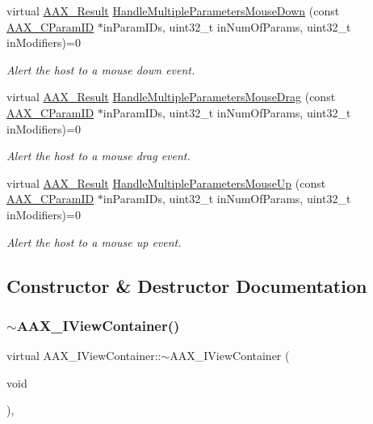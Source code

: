 \begin{Indent}
\begin{DoxyCompactItemize}
virtual \mbox{\hyperlink{a00392_a4d8f69a697df7f70c3a8e9b8ee130d2f}{A\+A\+X\+\_\+\+Result}} \mbox{\hyperlink{a01889_ae4eb23fadc9f9e437fbcf2a73741f635}{Handle\+Multiple\+Parameters\+Mouse\+Down}} (const \mbox{\hyperlink{a00392_a1440c756fe5cb158b78193b2fc1780d1}{A\+A\+X\+\_\+\+C\+Param\+ID}} $\ast$in\+Param\+I\+Ds, uint32\+\_\+t in\+Num\+Of\+Params, uint32\+\_\+t in\+Modifiers)=0
\begin{DoxyCompactList}\small\item\em Alert the host to a mouse down event. \end{DoxyCompactList}\item 
virtual \mbox{\hyperlink{a00392_a4d8f69a697df7f70c3a8e9b8ee130d2f}{A\+A\+X\+\_\+\+Result}} \mbox{\hyperlink{a01889_a719d04fae5908692f24395da0833c66d}{Handle\+Multiple\+Parameters\+Mouse\+Drag}} (const \mbox{\hyperlink{a00392_a1440c756fe5cb158b78193b2fc1780d1}{A\+A\+X\+\_\+\+C\+Param\+ID}} $\ast$in\+Param\+I\+Ds, uint32\+\_\+t in\+Num\+Of\+Params, uint32\+\_\+t in\+Modifiers)=0
\begin{DoxyCompactList}\small\item\em Alert the host to a mouse drag event. \end{DoxyCompactList}\item 
virtual \mbox{\hyperlink{a00392_a4d8f69a697df7f70c3a8e9b8ee130d2f}{A\+A\+X\+\_\+\+Result}} \mbox{\hyperlink{a01889_ae387bc25da878eab0a97d4197ef70a94}{Handle\+Multiple\+Parameters\+Mouse\+Up}} (const \mbox{\hyperlink{a00392_a1440c756fe5cb158b78193b2fc1780d1}{A\+A\+X\+\_\+\+C\+Param\+ID}} $\ast$in\+Param\+I\+Ds, uint32\+\_\+t in\+Num\+Of\+Params, uint32\+\_\+t in\+Modifiers)=0
\begin{DoxyCompactList}\small\item\em Alert the host to a mouse up event. \end{DoxyCompactList}\end{DoxyCompactItemize}
\end{Indent}


\subsection{Constructor \& Destructor Documentation}
\mbox{\label{a01889_af41d1aaaf56e5f4e949fffc688a04247}} 
\subsubsection{\texorpdfstring{$\sim$AAX\_IViewContainer()}{~AAX\_IViewContainer()}}
{\footnotesize\ttfamily virtual A\+A\+X\+\_\+\+I\+View\+Container\+::$\sim$\+A\+A\+X\+\_\+\+I\+View\+Container (\begin{DoxyParamCaption}\item[{void}]{ }\end{DoxyParamCaption})\hspace{0.3cm}{\ttfamily [inline]}, {\ttfamily [virtual]}}



